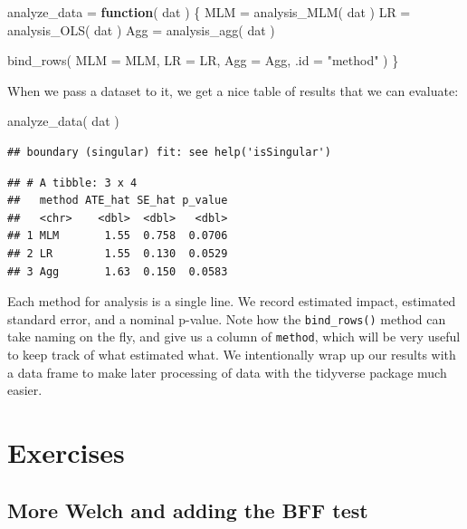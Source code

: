 \documentclass[
]{book}
\newenvironment{Shaded}{\begin{snugshade}}{\end{snugshade}}
\newcommand{\AttributeTok}[1]{\textcolor[rgb]{0.77,0.63,0.00}{#1}}
\newcommand{\ControlFlowTok}[1]{\textcolor[rgb]{0.13,0.29,0.53}{\textbf{#1}}}
\newcommand{\FunctionTok}[1]{\textcolor[rgb]{0.00,0.00,0.00}{#1}}
\newcommand{\NormalTok}[1]{#1}
\newcommand{\OtherTok}[1]{\textcolor[rgb]{0.56,0.35,0.01}{#1}}
\newcommand{\StringTok}[1]{\textcolor[rgb]{0.31,0.60,0.02}{#1}}
\begin{document}
\begin{Shaded}
\begin{Highlighting}[]
\NormalTok{analyze\_data }\OtherTok{=} \ControlFlowTok{function}\NormalTok{( dat ) \{}
\NormalTok{  MLM }\OtherTok{=} \FunctionTok{analysis\_MLM}\NormalTok{( dat )}
\NormalTok{  LR }\OtherTok{=} \FunctionTok{analysis\_OLS}\NormalTok{( dat )}
\NormalTok{  Agg }\OtherTok{=} \FunctionTok{analysis\_agg}\NormalTok{( dat )}
  
  \FunctionTok{bind\_rows}\NormalTok{( }\AttributeTok{MLM =}\NormalTok{ MLM, }\AttributeTok{LR =}\NormalTok{ LR, }\AttributeTok{Agg =}\NormalTok{ Agg,}
             \AttributeTok{.id =} \StringTok{"method"}\NormalTok{ )}
\NormalTok{\}}
\end{Highlighting}
\end{Shaded}

When we pass a dataset to it, we get a nice table of results that we can evaluate:

\begin{Shaded}
\begin{Highlighting}[]
\FunctionTok{analyze\_data}\NormalTok{( dat )}
\end{Highlighting}
\end{Shaded}

\begin{verbatim}
## boundary (singular) fit: see help('isSingular')
\end{verbatim}

\begin{verbatim}
## # A tibble: 3 x 4
##   method ATE_hat SE_hat p_value
##   <chr>    <dbl>  <dbl>   <dbl>
## 1 MLM       1.55  0.758  0.0706
## 2 LR        1.55  0.130  0.0529
## 3 Agg       1.63  0.150  0.0583
\end{verbatim}

Each method for analysis is a single line. We record estimated impact, estimated standard error, and a nominal p-value.
Note how the \texttt{bind\_rows()} method can take naming on the fly, and give us a column of \texttt{method}, which will be very useful to keep track of what estimated what.
We intentionally wrap up our results with a data frame to make later processing of data with the tidyverse package much easier.

\hypertarget{exercises-1}{%
\section{Exercises}\label{exercises-1}}

\hypertarget{more-welch-and-adding-the-bff-test}{%
\subsection{More Welch and adding the BFF test}\label{more-welch-and-adding-the-bff-test}}
\end{document}
